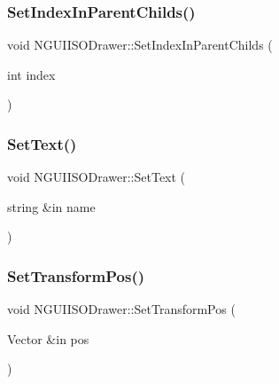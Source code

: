 \hypertarget{class_n_g_u_i_i_s_o_drawer_a74435de8e2cc76ce168a4616bd1b30d3}{}\label{class_n_g_u_i_i_s_o_drawer_a74435de8e2cc76ce168a4616bd1b30d3} 
\subsubsection{\texorpdfstring{Set\+Index\+In\+Parent\+Childs()}{SetIndexInParentChilds()}}
{\footnotesize\ttfamily void N\+G\+U\+I\+I\+S\+O\+Drawer\+::\+Set\+Index\+In\+Parent\+Childs (\begin{DoxyParamCaption}\item[{int}]{index }\end{DoxyParamCaption})}

\hypertarget{class_n_g_u_i_i_s_o_drawer_ade75af70444ce0dacaecd2599d7a3c8b}{}\label{class_n_g_u_i_i_s_o_drawer_ade75af70444ce0dacaecd2599d7a3c8b} 
\subsubsection{\texorpdfstring{Set\+Text()}{SetText()}}
{\footnotesize\ttfamily void N\+G\+U\+I\+I\+S\+O\+Drawer\+::\+Set\+Text (\begin{DoxyParamCaption}\item[{string \&in}]{name }\end{DoxyParamCaption})}

\hypertarget{class_n_g_u_i_i_s_o_drawer_a2aefdf83e426c25615ea50a9530b5191}{}\label{class_n_g_u_i_i_s_o_drawer_a2aefdf83e426c25615ea50a9530b5191} 
\subsubsection{\texorpdfstring{Set\+Transform\+Pos()}{SetTransformPos()}}
{\footnotesize\ttfamily void N\+G\+U\+I\+I\+S\+O\+Drawer\+::\+Set\+Transform\+Pos (\begin{DoxyParamCaption}\item[{Vector \&in}]{pos }\end{DoxyParamCaption})}

